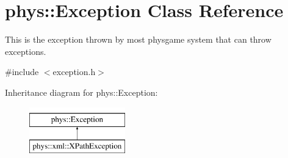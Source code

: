 \hypertarget{classphys_1_1Exception}{
\section{phys::Exception Class Reference}
\label{dc/d47/classphys_1_1Exception}
}


This is the exception thrown by most physgame system that can throw exceptions.  




{\ttfamily \#include $<$exception.h$>$}

Inheritance diagram for phys::Exception:\begin{figure}[H]
\begin{center}
\leavevmode
\includegraphics[height=2.000000cm]{dc/d47/classphys_1_1Exception}
\end{center}
\end{figure}
